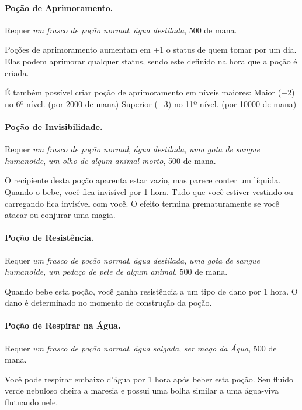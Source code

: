 \begin{multicols}{2}
\paragraph{Poção de Aprimoramento.}

Requer \textit{um frasco de poção normal}, \textit{água destilada}, 500 de mana.

Poções de aprimoramento aumentam em +1 o status de quem tomar por um dia. Elas
podem aprimorar qualquer status, sendo este definido na hora que a poção é
criada.

É também possível criar poção de aprimoramento em níveis maiores: \nl
Maior (+2) no 6º nível. (por 2000 de mana) \nl
Superior (+3) no 11º nível. (por 10000 de mana) \nl

\paragraph{Poção de Invisibilidade.}

Requer \textit{um frasco de poção normal}, \textit{água destilada}, \textit{uma
gota de sangue humanoide}, \textit{um olho de algum animal morto}, 500 de mana.

O recipiente desta poção aparenta estar vazio, mas parece conter um líquida.
Quando o bebe, você fica invisível por 1 hora. Tudo que você estiver vestindo ou
carregando fica invisível com você. O efeito termina prematuramente se você
atacar ou conjurar uma magia.

\paragraph{Poção de Resistência.}

Requer \textit{um frasco de poção normal}, \textit{água destilada}, \textit{uma
gota de sangue humanoide}, \textit{um pedaço de pele de algum animal}, 500 de
mana.

Quando bebe esta poção, você ganha resistência a um tipo de dano por 1 hora. O
dano é determinado no momento de construção da poção.

\paragraph{Poção de Respirar na Água.}

Requer \textit{um frasco de poção normal}, \textit{água salgada}, \textit{ser
mago da Água}, 500 de mana.

Você pode respirar embaixo d'água por 1 hora após beber esta poção. Seu fluido
verde nebuloso cheira a maresia e possui uma bolha similar a uma água-viva
flutuando nele.


\end{multicols}
